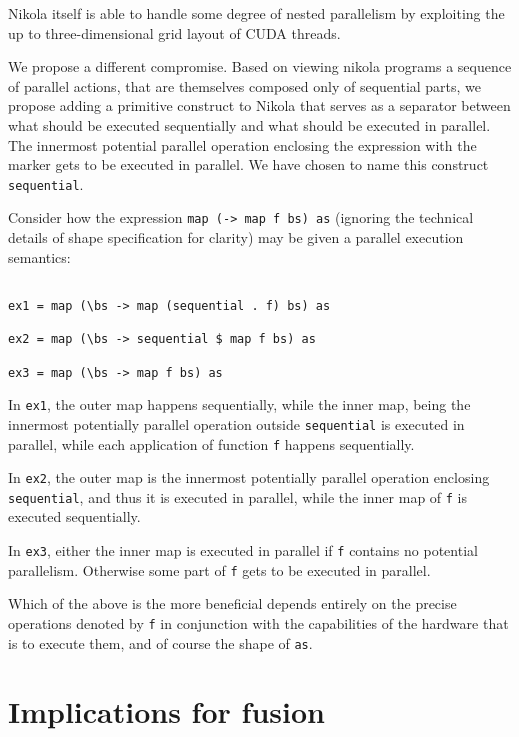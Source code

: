 Nikola itself is able to handle some degree of nested parallelism by exploiting
the up to three-dimensional grid layout of CUDA threads.

We propose a different compromise. Based on viewing nikola programs a sequence
of parallel actions, that are themselves composed only of sequential parts, we
propose adding a primitive construct to Nikola that serves as a separator
between what should be executed sequentially and what should be executed in
parallel. The innermost potential parallel operation enclosing the expression
with the marker gets to be executed in parallel. We have chosen to name this
construct \texttt{sequential}.

Consider how the expression \texttt{map (\bs -> map f bs) as} (ignoring the
technical details of shape specification for clarity) may be given a parallel
execution semantics:

\begin{verbatim}

ex1 = map (\bs -> map (sequential . f) bs) as

ex2 = map (\bs -> sequential $ map f bs) as

ex3 = map (\bs -> map f bs) as

\end{verbatim}

In \texttt{ex1}, the outer map happens sequentially, while the inner map, being
the innermost potentially parallel operation outside \texttt{sequential} is
executed in parallel, while each application of function \texttt{f} happens
sequentially.

In \texttt{ex2}, the outer map is the innermost potentially parallel operation
enclosing \texttt{sequential}, and thus it is executed in parallel, while the
inner map of \texttt{f} is executed sequentially.

In \texttt{ex3}, either the inner map is executed in parallel if \texttt{f}
contains no potential parallelism. Otherwise some part of \texttt{f} gets to be
executed in parallel.

Which of the above is the more beneficial depends entirely on the precise
operations denoted by \texttt{f} in conjunction with the capabilities of the
hardware that is to execute them, and of course the shape of \texttt{as}.

\section{Implications for fusion}

